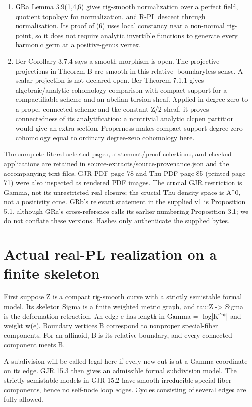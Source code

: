 \documentclass[11pt]{article}
\begin{document}
\begin{enumerate}
\item GRa Lemma 3.9(1,4,6) gives rig-smooth normalization over a perfect field, quotient topology for normalization, and R-PL descent through normalization. Its proof of (6) uses local constancy near a non-normal rig-point, so it does not require analytic invertible functions to generate every harmonic germ at a positive-genus vertex.
\item Ber Corollary 3.7.4 says a smooth morphism is open. The projective projections in Theorem B are smooth in this relative, boundaryless sense. A scalar projection is not declared open. Ber Theorem 7.1.1 gives algebraic/analytic cohomology comparison with compact support for a compactifiable scheme and an abelian torsion sheaf. Applied in degree zero to a proper connected scheme and the constant Z/2 sheaf, it proves connectedness of its analytification: a nontrivial analytic clopen partition would give an extra section. Properness makes compact-support degree-zero cohomology equal to ordinary degree-zero cohomology here.
\end{enumerate}

The complete literal selected pages, statement/proof selections, and checked applications are retained in source-extracts/source-provenance.json and the accompanying text files. GJR PDF page 78 and Thu PDF page 85 (printed page 71) were also inspected as rendered PDF images. The crucial GJR restriction is Gamma, not its unrestricted real closure; the crucial Thu density space is A\textasciicircum{}0, not a positivity cone. GRb's relevant statement in the supplied v1 is Proposition 5.1, although GRa's cross-reference calls its earlier numbering Proposition 3.1; we do not conflate these versions. Hashes only authenticate the supplied bytes.

\section{Actual real-PL realization on a finite skeleton}

First suppose Z is a compact rig-smooth curve with a strictly semistable formal model. Its skeleton Sigma is a finite weighted metric graph, and tau:Z -> Sigma is the deformation retraction. An edge e has length in Gamma = -log|K\textasciicircum{}*| and weight w(e). Boundary vertices B correspond to nonproper special-fiber components. For an affinoid, B is its relative boundary, and every connected component meets B.

A subdivision will be called legal here if every new cut is at a Gamma-coordinate on its edge. GJR 15.3 then gives an admissible formal subdivision model. The strictly semistable models in GJR 15.2 have smooth irreducible special-fiber components, hence no self-node loop edges. Cycles consisting of several edges are fully allowed.
\end{document}
